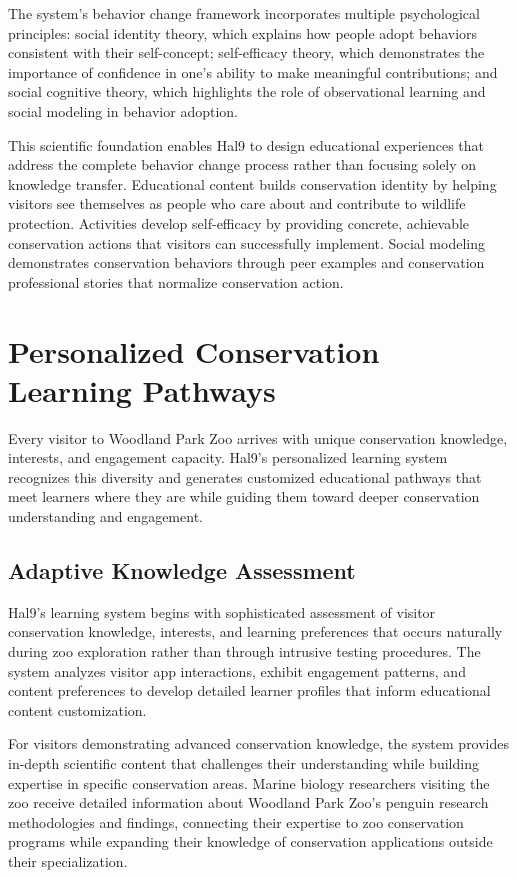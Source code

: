 \documentclass[
  Letterpaper,
]{scrbook}
\begin{document}
The system's behavior change framework incorporates multiple
psychological principles: social identity theory, which explains how
people adopt behaviors consistent with their self-concept; self-efficacy
theory, which demonstrates the importance of confidence in one's ability
to make meaningful contributions; and social cognitive theory, which
highlights the role of observational learning and social modeling in
behavior adoption.

This scientific foundation enables Hal9 to design educational
experiences that address the complete behavior change process rather
than focusing solely on knowledge transfer. Educational content builds
conservation identity by helping visitors see themselves as people who
care about and contribute to wildlife protection. Activities develop
self-efficacy by providing concrete, achievable conservation actions
that visitors can successfully implement. Social modeling demonstrates
conservation behaviors through peer examples and conservation
professional stories that normalize conservation action.

\section{Personalized Conservation Learning
Pathways}\label{personalized-conservation-learning-pathways}

Every visitor to Woodland Park Zoo arrives with unique conservation
knowledge, interests, and engagement capacity. Hal9's personalized
learning system recognizes this diversity and generates customized
educational pathways that meet learners where they are while guiding
them toward deeper conservation understanding and engagement.

\subsection{Adaptive Knowledge
Assessment}\label{adaptive-knowledge-assessment}

Hal9's learning system begins with sophisticated assessment of visitor
conservation knowledge, interests, and learning preferences that occurs
naturally during zoo exploration rather than through intrusive testing
procedures. The system analyzes visitor app interactions, exhibit
engagement patterns, and content preferences to develop detailed learner
profiles that inform educational content customization.

For visitors demonstrating advanced conservation knowledge, the system
provides in-depth scientific content that challenges their understanding
while building expertise in specific conservation areas. Marine biology
researchers visiting the zoo receive detailed information about Woodland
Park Zoo's penguin research methodologies and findings, connecting their
expertise to zoo conservation programs while expanding their knowledge
of conservation applications outside their specialization.
\end{document}
